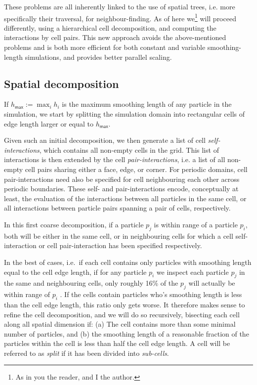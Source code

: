 \documentclass[final]{siamltex}
\begin{document}
These problems are all inherently linked to the use of
spatial trees, i.e. more specifically their traversal,
for neighbour-finding.
As of here we\footnote{As in you the reader, and I the author.}
will proceed differently, using a hierarchical cell
decomposition, and computing the interactions by cell pairs.
This new approach avoids the above-mentioned problems and
is both more efficient for both constant and variable smoothing-length
simulations, and provides better parallel scaling.


\subsection{Spatial decomposition}

If $h_\mathsf{max} := \max_i  h_i $ is the maximum smoothing
length of any particle in the simulation, we start by splitting
the simulation domain into rectangular cells of edge length
larger or equal to $h_\mathsf{max}$.

Given such an initial decomposition, we then generate
a list of cell {\em self-interactions}, which contains all
non-empty cells in the grid.
This list of interactions is then extended by the cell
{\em pair-interactions}, i.e. a list of all non-empty cell pairs
sharing either a face, edge, or corner.
For periodic domains, cell pair-interactions need also be
specified for cell neighbouring each other across
periodic boundaries.
These self- and pair-interactions encode, conceptually at least,
the evaluation of the interactions between all particles
in the same cell, or all interactions between particle pairs
spanning a pair of cells, respectively.

In this first coarse decomposition, if a particle $p_j$
is within range of a particle $p_i$, both will be either
in the same cell, or in neighbouring cells for which a
cell self-interaction or cell pair-interaction has been
specified respectively.

In the best of cases, i.e.~if each cell contains
only particles with smoothing length equal to the cell
edge length, if for any particle $p_i$ we inspect each
particle $p_j$ in the same
and neighbouring cells, only roughly 16\% of the $p_j$
will actually be within range of $p_i$ \cite{ref:Gonnet2007}.
If the cells contain particles who's smoothing length
is less than the cell edge length, this ratio only
gets worse.
It therefore makes sense to refine the cell decomposition,
and we will do so recursively, bisecting each cell along
all spatial dimension if: (a) The cell contains more than
some minimal number of particles, and (b) the smoothing
length of a reasonable fraction of the particles within
the cell is less than half the cell edge length.
A cell will be referred to as {\em split} if it
has been divided into {\em sub-cells}.
\end{document}
